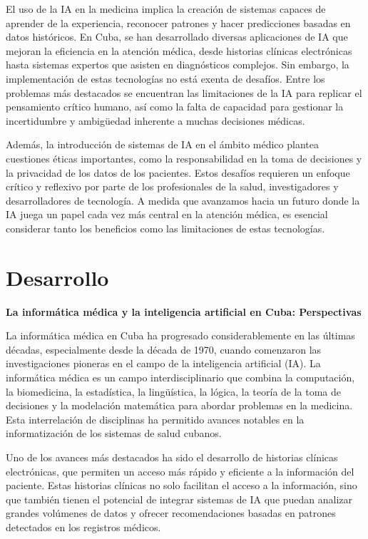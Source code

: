 \documentclass[a4paper,10pt]{article}
\begin{document}
El uso de la IA en la medicina implica la creación de sistemas capaces de aprender de la experiencia, reconocer patrones y hacer predicciones basadas en datos históricos. En Cuba, se han desarrollado diversas aplicaciones de IA que mejoran la eficiencia en la atención médica, desde historias clínicas electrónicas hasta sistemas expertos que asisten en diagnósticos complejos. Sin embargo, la implementación de estas tecnologías no está exenta de desafíos. Entre los problemas más destacados se encuentran las limitaciones de la IA para replicar el pensamiento crítico humano, así como la falta de capacidad para gestionar la incertidumbre y ambigüedad inherente a muchas decisiones médicas.\vspace{1cm}

Además, la introducción de sistemas de IA en el ámbito médico plantea cuestiones éticas importantes, como la responsabilidad en la toma de decisiones y la privacidad de los datos de los pacientes. Estos desafíos requieren un enfoque crítico y reflexivo por parte de los profesionales de la salud, investigadores y desarrolladores de tecnología. A medida que avanzamos hacia un futuro donde la IA juega un papel cada vez más central en la atención médica, es esencial considerar tanto los beneficios como las limitaciones de estas tecnologías.
\vspace{1cm}


\section{Desarrollo}
\textbf{La informática médica y la inteligencia artificial en Cuba: Perspectivas}

La informática médica en Cuba ha progresado considerablemente en las últimas décadas, especialmente desde la década de 1970, cuando comenzaron las investigaciones pioneras en el campo de la inteligencia artificial (IA). La informática médica es un campo interdisciplinario que combina la computación, la biomedicina, la estadística, la lingüística, la lógica, la teoría de la toma de decisiones y la modelación matemática para abordar problemas en la medicina. Esta interrelación de disciplinas ha permitido avances notables en la informatización de los sistemas de salud cubanos.\vspace{1cm}

Uno de los avances más destacados ha sido el desarrollo de historias clínicas electrónicas, que permiten un acceso más rápido y eficiente a la información del paciente. Estas historias clínicas no solo facilitan el acceso a la información, sino que también tienen el potencial de integrar sistemas de IA que puedan analizar grandes volúmenes de datos y ofrecer recomendaciones basadas en patrones detectados en los registros médicos.\vspace{1cm}
\end{document}
